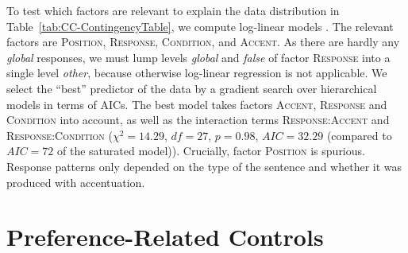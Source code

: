 \documentclass[fleqn,reqno,10pt]{article}
\begin{document}
To test which factors are relevant to explain the data distribution in
Table~\ref{tab:CC-ContingencyTable}, we compute log-linear models
\citep{KnokeBurke1980:Log-Linear-Mode}. The relevant factors are
\textsc{Position}, \textsc{Response}, \textsc{Condition}, and
\textsc{Accent}. As there are hardly any \emph{global} responses, we
must lump levels \emph{global} and \emph{false} of factor
\textsc{Response} into a single level \emph{other}, because otherwise
log-linear regression is not applicable. We select the ``best''
predictor of the data by a gradient search over hierarchical models in
terms of AICs. The best model takes factors \textsc{Accent},
\textsc{Response} and \textsc{Condition} into account, as well as the
interaction terms \textsc{Response:Accent} and
\textsc{Response:Condition} ($\chi^2 = 14.29$, $df=27$, $p = 0.98$,
$AIC = 32.29$ (compared to $AIC=72$ of the saturated
model)). Crucially, factor \textsc{Position} is spurious. Response
patterns only depended on the type of the sentence and whether it was
produced with accentuation. 





\section{Preference-Related Controls}
\label{sec:pref-relat-contr}
\end{document}
